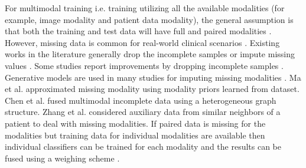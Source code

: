For multimodal training i.e. training utilizing all the available modalities (for example, image modality and patient data modality), the general assumption is that both the training and test data will have full and paired modalities \cite{ngiam2011multimodal,Zadeh2017}. However, missing data is common for real-world clinical scenarios \cite{Huang2020}. Existing works in the literature generally drop the incomplete samples or impute missing values \cite{ma2021smil, 10.1145/3534678.3539388}. Some studies report improvements by dropping incomplete samples \cite{10.1145/3308558.3313643, wang2020multimodal}. Generative models are used in many studies for imputing missing modalities \cite{LI2020105592, 10.1145/3219819.3219963, pan2021disease}. Ma et al. \cite{ma2021smil} approximated missing modality using modality priors learned from dataset. Chen et al. \cite{10.1145/3394486.3403182} fused multimodal incomplete data using a heterogeneous graph structure. Zhang et al. \cite{10.1145/3534678.3539388} considered auxiliary data from similar neighbors of a patient to deal with missing modalities. If paired data is missing for the modalities but training data for individual modalities are available then individual classifiers can be trained for each modality and the results can be fused using a weighing scheme \cite{rahate2022multimodal}.



